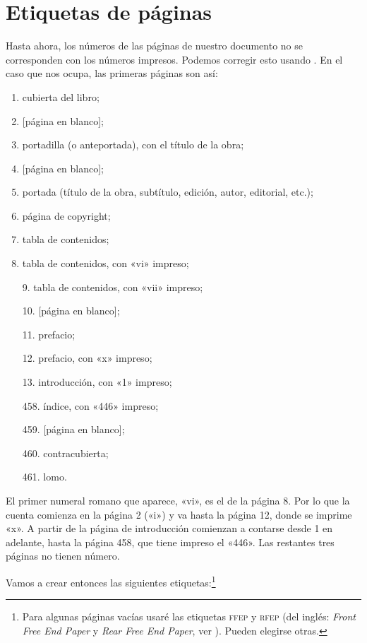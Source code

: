 \documentclass[%
	a5paper,
	10pt,
	twoside,
	openright,
	final,
]{memoir}
\begin{document}
{	\section{Etiquetas de páginas\label{sec:pdfPageLabels}} Hasta ahora, los números de las páginas de nuestro documento no se corresponden con los números impresos. Podemos corregir esto usando \acrobat. En el caso que nos ocupa, las primeras páginas son así:

	\begin{multicols}{2}
		\begin{enumerate}[noitemsep]
			\item cubierta del libro;
			\item {[página en blanco]};
			\item portadilla (o anteportada), con el título de la obra;
			\item {[página en blanco]};
			\item portada (título de la obra, subtítulo, edición, autor, editorial, etc.);
			\item página de copyright;
			\item tabla de contenidos;
			\item tabla de contenidos, con «vi» impreso;
			\item[9.] tabla de contenidos, con «vii» impreso;
			\item[10.] {[página en blanco]};
			\item[11.] prefacio;
			\item[12.] prefacio, con «x» impreso;
			\item[13.] introducción, con «1» impreso;
			\item[] \raisebox{.2em}{\ldots}
			\item[458.] índice, con «446» impreso;
			\item[459.] {[página en blanco]};
			\item[460.] contracubierta;
			\item[461.] lomo.
		\end{enumerate}
	\end{multicols}

	El primer numeral romano que aparece, «vi», es el de la página 8. Por lo que la cuenta comienza en la página 2 («i») y va hasta la página 12, donde se imprime «x». A partir de la página de introducción comienzan a contarse desde 1 en adelante, hasta la página 458, que tiene impreso el «446». Las restantes tres páginas no tienen número.

	Vamos a crear entonces las siguientes etiquetas:\footnote{Para algunas páginas vacías usaré las etiquetas \textsc{ffep} y \textsc{rfep} (del inglés: \emph{Front Free End Paper} y \emph{Rear Free End Paper}, ver \cite{FFEP}). Pueden elegirse otras.}

}
\end{document}
